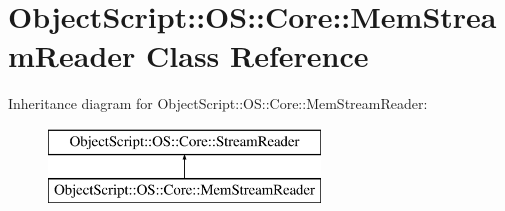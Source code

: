 \hypertarget{class_object_script_1_1_o_s_1_1_core_1_1_mem_stream_reader}{}\section{Object\+Script\+:\+:OS\+:\+:Core\+:\+:Mem\+Stream\+Reader Class Reference}
\label{class_object_script_1_1_o_s_1_1_core_1_1_mem_stream_reader}
Inheritance diagram for Object\+Script\+:\+:OS\+:\+:Core\+:\+:Mem\+Stream\+Reader\+:\begin{figure}[H]
\begin{center}
\leavevmode
\includegraphics[height=2.000000cm]{class_object_script_1_1_o_s_1_1_core_1_1_mem_stream_reader}
\end{center}
\end{figure}
